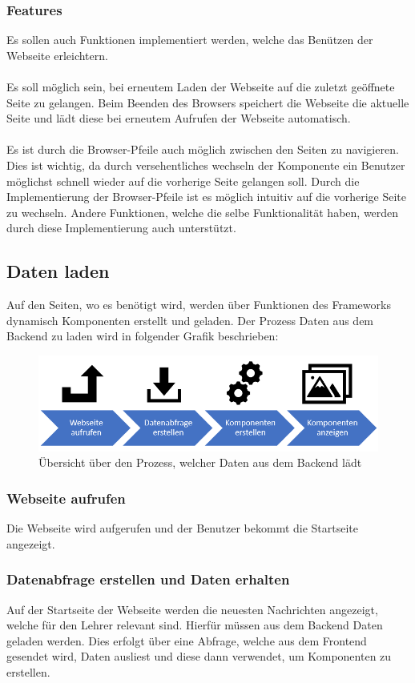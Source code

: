 \subsubsection{Features}
\label{sec:feature}
Es sollen auch Funktionen implementiert werden, welche das Benützen der Webseite erleichtern.
\\\\
Es soll möglich sein, bei erneutem Laden der Webseite auf die zuletzt geöffnete Seite zu gelangen. Beim Beenden des Browsers speichert die Webseite die aktuelle Seite und lädt diese bei erneutem Aufrufen der Webseite automatisch.
\\\\
Es ist durch die Browser-Pfeile auch möglich zwischen den Seiten zu navigieren. Dies ist wichtig, da durch versehentliches wechseln der Komponente ein Benutzer möglichst schnell wieder auf die vorherige Seite gelangen soll. Durch die Implementierung der Browser-Pfeile ist es möglich intuitiv auf die vorherige Seite zu wechseln. Andere Funktionen, welche die selbe Funktionalität haben, werden durch diese Implementierung auch unterstützt.
\newpage
\subsection{Daten laden}
Auf den Seiten, wo es benötigt wird, werden über Funktionen des Frameworks dynamisch Komponenten erstellt und geladen. Der Prozess Daten aus dem Backend zu laden wird in folgender Grafik beschrieben:
\begin{figure}[H]
	\centering
	\includegraphics[width=0.8\linewidth]{images/Prozess_Daten_laden}
	\caption[Prozess der Daten zur Anzeige]{Übersicht über den Prozess, welcher Daten aus dem Backend lädt}
	\label{fig:prozessdatenladen}
\end{figure}

\subsubsection{Webseite aufrufen}
Die Webseite wird aufgerufen und der Benutzer bekommt die Startseite angezeigt.

\subsubsection{Datenabfrage erstellen und Daten erhalten}
Auf der Startseite der Webseite werden die neuesten Nachrichten angezeigt, welche für den Lehrer relevant sind. Hierfür müssen aus dem Backend Daten geladen werden. Dies erfolgt über eine Abfrage, welche aus dem Frontend gesendet wird, Daten ausliest und diese dann verwendet, um Komponenten zu erstellen.

